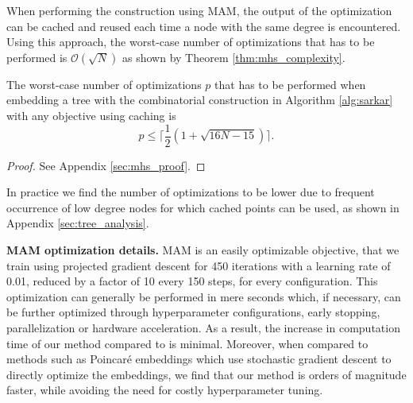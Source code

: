 When performing the construction using MAM, the output of the optimization can be cached and reused each time a node with the same degree is encountered. Using this approach, the worst-case number of optimizations that has to be performed is $\mathcal{O}(\sqrt{N})$ as shown by Theorem \ref{thm:mhs_complexity}. 

\begin{theorem}\label{thm:mhs_complexity}
    The worst-case number of optimizations $p$ that has to be performed when embedding a tree with the combinatorial construction in Algorithm \ref{alg:sarkar} with any objective using caching is
    \begin{equation}
        p \leq \Big\lceil \frac{1}{2} (1 + \sqrt{16N - 15}) \Big\rceil.
    \end{equation}
\end{theorem}

\vspace{-0.4cm}
\begin{proof}
    See Appendix \ref{sec:mhs_proof}.
\end{proof}
\vspace{-0.4cm}

In practice we find the number of optimizations to be lower due to frequent occurrence of low degree nodes for which cached points can be used, as shown in Appendix \ref{sec:tree_analysis}.

\textbf{MAM optimization details.} MAM is an easily optimizable objective, that we train using projected gradient descent for 450 iterations with a learning rate of 0.01, reduced by a factor of 10 every 150 steps, for every configuration. This optimization can generally be performed in mere seconds which, if necessary, can be further optimized through hyperparameter configurations, early stopping, parallelization or hardware acceleration. As a result, the increase in computation time of our method compared to \citep{sala2018representation} is minimal. Moreover, when compared to methods such as Poincaré embeddings \citep{nickel2017poincare} which use stochastic gradient descent to directly optimize the embeddings, we find that our method is orders of magnitude faster, while avoiding the need for costly hyperparameter tuning. 

